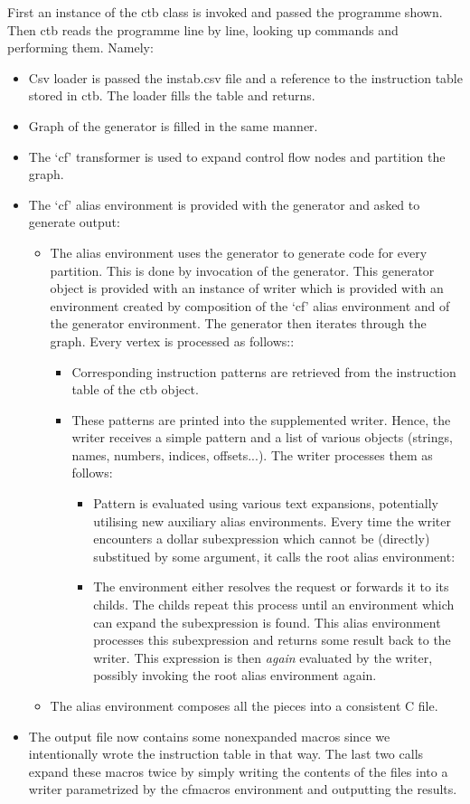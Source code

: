 First an instance of the ctb class is invoked and passed the programme shown. Then ctb reads the programme line by line, looking up commands and performing them. Namely:
\begin{itemize}
  \item Csv loader is passed the instab.csv file and a reference to the instruction table stored in ctb. The loader fills the table and returns.
  \item Graph of the generator is filled in the same manner.
  \item The `cf' transformer is used to expand control flow nodes and partition the graph.
  \item The `cf' alias environment is provided with the generator and asked to generate output:
  \begin{itemize}
    \item The alias environment uses the generator to generate code for every partition. This is done by invocation of the generator. This generator object is provided with an instance of writer which is provided with an environment created by composition of the `cf' alias environment and of the generator environment. The generator then iterates through the graph. Every vertex is processed as follows::
    \begin{itemize}
      \item Corresponding instruction patterns are retrieved from the instruction table of the ctb object.
      \item These patterns are printed into the supplemented writer. Hence, the writer receives a simple pattern and a list of various objects (strings, names, numbers, indices, offsets...). The writer processes them as follows:
        \begin{itemize}
          \item Pattern is evaluated using various text expansions, potentially utilising new auxiliary alias environments. Every time the writer encounters a dollar subexpression which cannot be (directly) substitued by some argument, it calls the root alias environment:
          \item The environment either resolves the request or forwards it to its childs. The childs repeat this process until an environment which can expand the subexpression is found. This alias environment processes this subexpression and returns some result back to the writer. This expression is then \emph{again} evaluated by the writer, possibly invoking the root alias environment again.
        \end{itemize}
    \end{itemize}
    \item The alias environment composes all the pieces into a consistent C file.
  \end{itemize}
  \item The output file now contains some nonexpanded macros since we intentionally wrote the instruction table in that way. The last two calls expand these macros twice by simply writing the contents of the files into a writer parametrized by the cfmacros environment and outputting the results.
\end{itemize}

